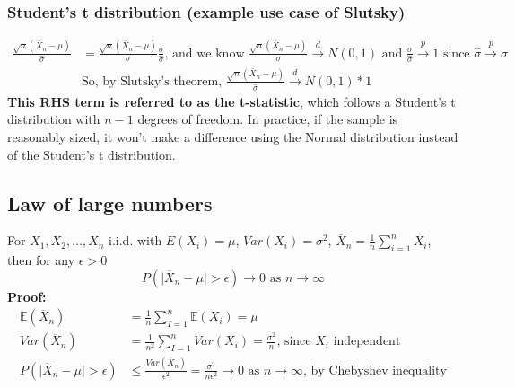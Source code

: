\documentclass{article}
\newcommand{\abs}[1]{\lvert#1\rvert}
\begin{document}
\subsubsection{Student's t distribution (example use case of Slutsky)} 
\begin{align*}
    \frac{\sqrt{n}(\bar{X}_n - \mu)}{\hat{\sigma}} &= \frac{\sqrt{n}(\bar{X}_n - \mu)}{\sigma} \frac{\sigma}{\hat{\sigma}}
    \textrm{, and we know } \frac{\sqrt{n}(\bar{X}_n - \mu)}{\sigma} \overset{d}{\longrightarrow} N(0, 1)\textrm{ and } \frac{\sigma}{\hat{\sigma}} \overset{p}{\longrightarrow} 1 \textrm{ since } \hat{\sigma} \overset{p}{\longrightarrow} \sigma\\
    &\textrm{So, by Slutsky's theorem, } \frac{\sqrt{n}(\bar{X}_n - \mu)}{\hat{\sigma}} \overset{d}{\longrightarrow} N(0, 1) * 1
\end{align*}
\textbf{This RHS term is referred to as the t-statistic}, which follows a Student's t distribution with $n-1$ degrees of freedom. In practice, if the sample is reasonably sized, it won't make a difference using the Normal distribution instead of the Student's t distribution. 

\subsection{Law of large numbers}
For $X_1, X_2, \dots, X_n$ i.i.d. with $E(X_i) = \mu$,  $Var(X_i) = \sigma^2$, $\overline{X}_n = \frac{1}{n}\sum_{i = 1}^n X_i$, then for any $\epsilon > 0$
\begin{equation*}
	P(\abs{\overline{X}_n - \mu} > \epsilon) \longrightarrow 0 \textrm{ as } n \rightarrow \infty
\end{equation*}
\textbf{Proof:}
\begin{align*}
	\mathbb{E}(\overline{X}_n) &= \frac{1}{n}\sum_{I = 1}^n \mathbb{E}(X_i) = \mu\\
    Var(\overline{X}_n) &= \frac{1}{n^2}\sum_{I = 1}^nVar(X_i) = \frac{\sigma^2}{n} \textrm{, since $X_i$ independent}\\
    P(\abs{\overline{X}_n - \mu} > \epsilon) &\leq \frac{Var(\overline{X}_n)}{\epsilon^2} = \frac{\sigma^2}{n\epsilon^2} \rightarrow 0 \textrm{ as } n \rightarrow \infty \textrm{, by Chebyshev inequality}
\end{align*}
\end{document}
